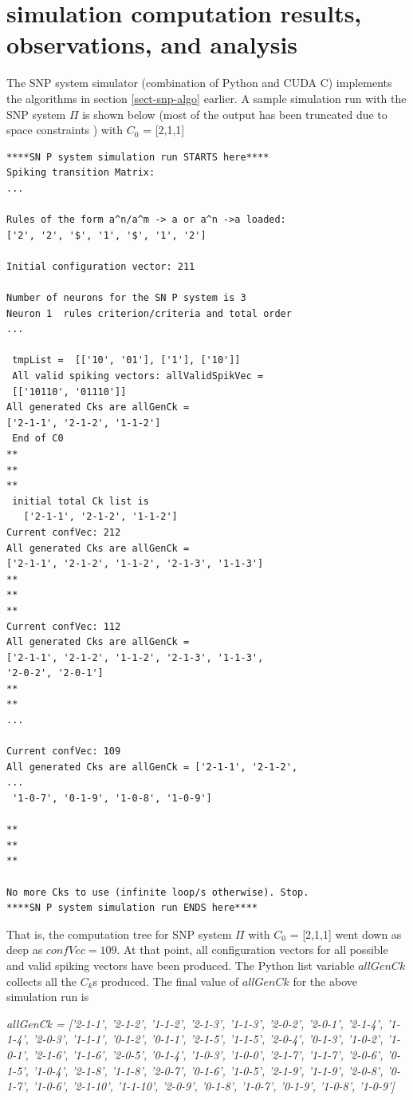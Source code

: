 \documentclass{acm_proc_article-sp}
\begin{document}
\section{simulation computation results, observations, and analysis}
The SNP system simulator (combination of Python
and CUDA C) implements the algorithms in section \ref{sect-snp-algo}
earlier. A sample simulation run with the SNP system $\Pi$ is
shown below (most of the output has been truncated due to space constraints ) with $C_0$ = [2,1,1]
\begin{verbatim}
****SN P system simulation run STARTS here****
Spiking transition Matrix: 
... 

Rules of the form a^n/a^m -> a or a^n ->a loaded: 
['2', '2', '$', '1', '$', '1', '2'] 

Initial configuration vector: 211
 
Number of neurons for the SN P system is 3 
Neuron 1  rules criterion/criteria and total order 
... 

 tmpList =  [['10', '01'], ['1'], ['10']] 
 All valid spiking vectors: allValidSpikVec =
 [['10110', '01110']] 
All generated Cks are allGenCk =
['2-1-1', '2-1-2', '1-1-2'] 
 End of C0 
** 
** 
** 
 initial total Ck list is
   ['2-1-1', '2-1-2', '1-1-2'] 
Current confVec: 212 
All generated Cks are allGenCk =
['2-1-1', '2-1-2', '1-1-2', '2-1-3', '1-1-3'] 
** 
** 
** 
Current confVec: 112 
All generated Cks are allGenCk =
['2-1-1', '2-1-2', '1-1-2', '2-1-3', '1-1-3',
'2-0-2', '2-0-1'] 
** 
** 
...

Current confVec: 109
All generated Cks are allGenCk = ['2-1-1', '2-1-2',
...
 '1-0-7', '0-1-9', '1-0-8', '1-0-9']

**
**
**

No more Cks to use (infinite loop/s otherwise). Stop.
****SN P system simulation run ENDS here****
\end{verbatim}

That is, the computation tree for SNP system $\Pi$ with $C_0$ = [2,1,1] went down as deep as $confVec = 109$. At that point, all configuration vectors for all possible and valid spiking vectors have been produced. The Python list variable $allGenCk$ collects all the $C_k$s produced. The final value of $allGenCk$ for the above simulation run is

\textit{
allGenCk = ['2-1-1', '2-1-2', '1-1-2', '2-1-3', '1-1-3', '2-0-2', '2-0-1', '2-1-4', '1-1-4', '2-0-3', '1-1-1', '0-1-2', '0-1-1', '2-1-5', '1-1-5', '2-0-4', '0-1-3', '1-0-2', '1-0-1', '2-1-6', '1-1-6', '2-0-5', '0-1-4', '1-0-3', '1-0-0', '2-1-7', '1-1-7', '2-0-6', '0-1-5', '1-0-4', '2-1-8', '1-1-8', '2-0-7', '0-1-6', '1-0-5', '2-1-9', '1-1-9', '2-0-8', '0-1-7', '1-0-6', '2-1-10', '1-1-10', '2-0-9', '0-1-8', '1-0-7', '0-1-9', '1-0-8', '1-0-9'] }
\end{document}
